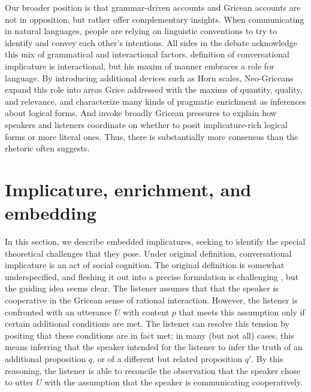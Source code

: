 \documentclass[leqno,12pt]{article}
\begin{document}
Our broader position is that grammar-driven accounts and Gricean
accounts are not in opposition, but rather offer complementary
insights.  When communicating in natural languages, people are relying
on linguistic conventions to try to identify and convey each other's
intentions. All sides in the debate acknowledge this mix of
grammatical and interactional factors.  definition
of conversational implicature is interactional, but his maxim of
manner embraces a role for language. By introducing additional devices
such as Horn scales, Neo-Griceans expand this role into areas Grice
addressed with the maxims of quantity, quality, and
relevance. \citet{Sperber95} and \citet{Bach94} characterize many
kinds of pragmatic enrichment as inferences about logical forms. And
\citet{ChierchiaFoxSpector08} invoke broadly Gricean pressures to
explain how speakers and listeners coordinate on whether to posit
implicature-rich logical forms or more literal ones. Thus, there is
substantially more consensus than the rhetoric often suggests.


\section{Implicature, enrichment, and embedding}\label{sec:implicature}


In this section, we describe embedded implicatures, seeking to
identify the special theoretical challenges that they pose.  Under
 original definition, conversational implicature is
an act of social cognition. The original definition is somewhat
underspecified, and fleshing it out into a precise formulation is
challenging \citep{Hirschberg85}, but the guiding idea seems clear.
The listener assumes that that the speaker is cooperative in the
Gricean sense of rational interaction. However, the listener is
confronted with an utterance $U$ with content $p$ that meets this
assumption only if certain additional conditions are met. The listener
can resolve this tension by positing that these conditions are in fact
met; in many (but not all) cases, this means inferring that the
speaker intended for the listener to infer the truth of an additional
proposition $q$, or of a different but related proposition $q'$. By
this reasoning, the listener is able to reconcile the observation that
the speaker chose to utter $U$ with the assumption that the speaker is
communicating cooperatively.
\end{document}
